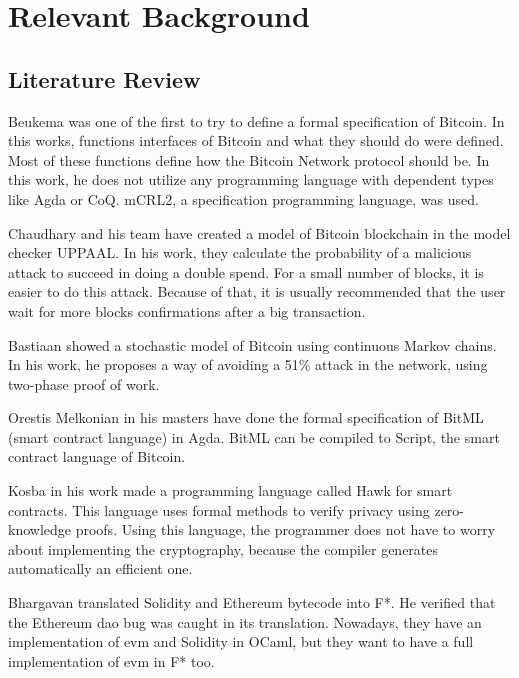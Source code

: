 \section{Relevant Background}

\subsection{Literature Review}

Beukema \cite{beukema2014formalising} was one of the first to try
to define a formal specification of Bitcoin.
In this works, functions interfaces of Bitcoin and what they should do were defined.
Most of these functions define how the Bitcoin Network protocol should be.
In this work, he does not utilize any programming language with dependent types like Agda or CoQ.
mCRL2, a specification programming language, was used.

Chaudhary and his team \cite{chaudhary2015modeling} have created a model of Bitcoin blockchain
in the model checker UPPAAL.
In his work, they calculate the probability of a malicious attack to succeed in doing a double spend.
For a small number of blocks, it is easier to do this attack.
Because of that, it is usually recommended that the user wait for more blocks confirmations
after a big transaction.

Bastiaan \cite{bastiaan2015preventing} showed a stochastic model of Bitcoin using
continuous Markov chains.
In his work, he proposes a way of avoiding a 51\% attack in the network,
using two-phase proof of work.

Orestis Melkonian \cite{melkonian2019formalizing} in his masters have done the formal specification
of BitML (smart contract language) in Agda.
BitML can be compiled to Script, the smart contract language of Bitcoin. 

Kosba \cite{kosba2016hawk} in his work made a programming language called Hawk for smart contracts.
This language uses formal methods to verify privacy using zero-knowledge proofs.
Using this language, the programmer does not have to worry about implementing the cryptography,
because the compiler generates automatically an efficient one.

Bhargavan \cite{bhargavan2016formal} translated Solidity and Ethereum bytecode into F*.
He verified that the Ethereum \gls{dao} bug was caught in its translation.
Nowadays, they have an implementation of \gls{evm} and Solidity in OCaml,
but they want to have a full implementation of \gls{evm} in F* too.

